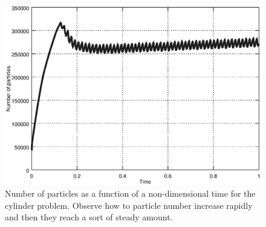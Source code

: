 \begin{figure}[htp] 
\centering 
\includegraphics[scale=.4]{./imgs/npart_cyl.eps}
\caption{Number of particles as a function of a non-dimensional time for the cylinder problem. Observe how to particle number increase rapidly and then they reach a sort of steady amount.}
\label{fig:cyl_npart}
\end{figure}


